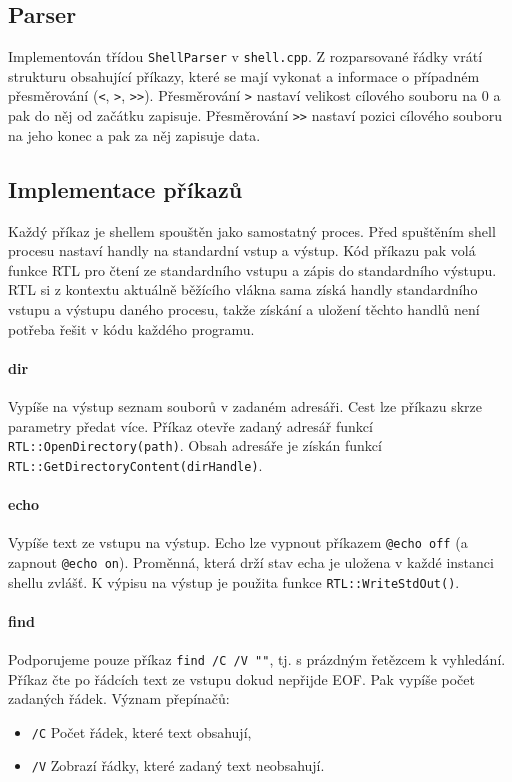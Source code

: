 \documentclass[11pt,a4paper]{scrartcl}
\begin{document}
	\subsection{Parser}
	Implementován třídou \verb|ShellParser| v \verb|shell.cpp|. Z rozparsované řádky vrátí strukturu obsahující příkazy, které se mají vykonat a informace o případném přesměrování (\verb|<|, \verb|>|, \verb|>>|). Přesměrování \verb|>| nastaví velikost cílového souboru na 0 a pak do něj od začátku zapisuje. Přesměrování \verb|>>| nastaví pozici cílového souboru na jeho konec a pak za něj zapisuje data.
	
	\subsection{Implementace příkazů}
	Každý příkaz je shellem spouštěn jako samostatný proces. Před spuštěním shell procesu nastaví handly na standardní vstup a výstup. Kód příkazu pak volá funkce RTL pro čtení ze standardního vstupu a zápis do standardního výstupu. RTL si z kontextu aktuálně běžícího vlákna sama získá handly standardního vstupu a výstupu daného procesu, takže získání a uložení těchto handlů není potřeba řešit v kódu každého programu.
	
	\paragraph{dir}
	Vypíše na výstup seznam souborů v zadaném adresáři. Cest lze příkazu skrze parametry předat více. Příkaz otevře zadaný adresář funkcí \verb|RTL::OpenDirectory(path)|. Obsah adresáře je získán funkcí \verb|RTL::GetDirectoryContent(dirHandle)|.
	
	\paragraph{echo}
	Vypíše text ze vstupu na výstup. Echo lze vypnout příkazem \verb|@echo off| (a zapnout \verb|@echo on|). Proměnná, která drží stav echa je uložena v každé instanci shellu zvlášť. K výpisu na výstup je použita funkce \verb|RTL::WriteStdOut()|.
	
	\paragraph{find}
	Podporujeme pouze příkaz \verb|find /C /V ""|, tj. s prázdným řetězcem k vyhledání. Příkaz čte po řádcích text ze vstupu dokud nepřijde EOF. Pak vypíše počet zadaných řádek.
	Význam přepínačů: 
	\begin{itemize}
		\item  \verb|/C| Počet řádek, které text obsahují,
		\item \verb|/V| Zobrazí řádky, které zadaný text neobsahují.
	\end{itemize}
	
\end{document}
